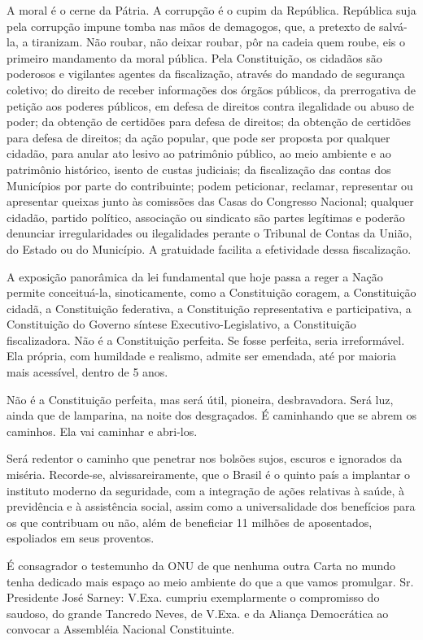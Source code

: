 A moral é o cerne da Pátria. A corrupção é o cupim da República.
República suja pela corrupção impune tomba nas mãos de demagogos, que, a
pretexto de salvá-la, a tiranizam. Não roubar, não deixar roubar, pôr na
cadeia quem roube, eis o primeiro mandamento da moral pública. Pela
Constituição, os cidadãos são poderosos e vigilantes agentes da
fiscalização, através do mandado de segurança coletivo; do direito de
receber informações dos órgãos públicos, da prerrogativa de petição aos
poderes públicos, em defesa de direitos contra ilegalidade ou abuso de
poder; da obtenção de certidões para defesa de direitos; da obtenção de
certidões para defesa de direitos; da ação popular, que pode ser
proposta por qualquer cidadão, para anular ato lesivo ao patrimônio
público, ao meio ambiente e ao patrimônio histórico, isento de custas
judiciais; da fiscalização das contas dos Municípios por parte do
contribuinte; podem peticionar, reclamar, representar ou apresentar
queixas junto às comissões das Casas do Congresso Nacional; qualquer
cidadão, partido político, associação ou sindicato são partes legítimas
e poderão denunciar irregularidades ou ilegalidades perante o Tribunal
de Contas da União, do Estado ou do Município. A gratuidade facilita a
efetividade dessa fiscalização.

A exposição panorâmica da lei fundamental que hoje passa a reger a Nação
permite conceituá-la, sinoticamente, como a Constituição coragem, a
Constituição cidadã, a Constituição federativa, a Constituição
representativa e participativa, a Constituição do Governo síntese
Executivo-Legislativo, a Constituição fiscalizadora. Não é a
Constituição perfeita. Se fosse perfeita, seria irreformável. Ela
própria, com humildade e realismo, admite ser emendada, até por maioria
mais acessível, dentro de 5 anos.

Não é a Constituição perfeita, mas será útil, pioneira, desbravadora.
Será luz, ainda que de lamparina, na noite dos desgraçados. É caminhando
que se abrem os caminhos. Ela vai caminhar e abri-los.

Será redentor o caminho que penetrar nos bolsões sujos, escuros e
ignorados da miséria. Recorde-se, alvissareiramente, que o Brasil é o
quinto país a implantar o instituto moderno da seguridade, com a
integração de ações relativas à saúde, à previdência e à assistência
social, assim como a universalidade dos benefícios para os que
contribuam ou não, além de beneficiar 11 milhões de aposentados,
espoliados em seus proventos.

É consagrador o testemunho da ONU de que nenhuma outra Carta no mundo
tenha dedicado mais espaço ao meio ambiente do que a que vamos
promulgar. Sr. Presidente José Sarney: V.Exa. cumpriu exemplarmente o
compromisso do saudoso, do grande Tancredo Neves, de V.Exa. e da Aliança
Democrática ao convocar a Assembléia Nacional Constituinte.

